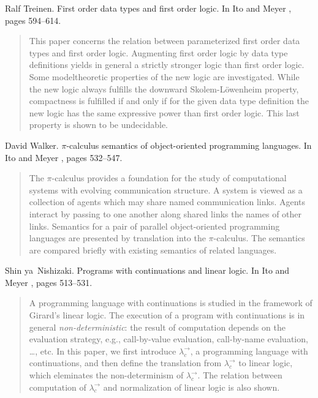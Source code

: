 \begin{thebibliography}{10}
Ralf Treinen.
\newblock First order data types and first order logic.
\newblock In Ito and Meyer \cite{TACS91}, pages 594--614.
\begin{quotation}
This paper concerns the relation between parameterized first order data types
  and first order logic. Augmenting first order logic by data type definitions
  yields in general a strictly stronger logic than first order logic. Some
  modeltheoretic properties of the new logic are investigated. While the new
  logic always fulfills the downward Skolem-L\"owenheim property, compactness
  is fulfilled if and only if for the given data type definition the new logic
  has the same expressive power than first order logic. This last property is
  shown to be undecidable.
\end{quotation}

David Walker.
\newblock $\pi$-calculus semantics of object-oriented programming languages.
\newblock In Ito and Meyer \cite{TACS91}, pages 532--547.
\begin{quotation}
The $\pi$-calculus provides a foundation for the study of computational systems
  with evolving communication structure. A system is viewed as a collection of
  agents which may share named communication links. Agents interact by passing
  to one another along shared links the names of other links. Semantics for a
  pair of parallel object-oriented programming languages are presented by
  translation into the $\pi$-calculus. The semantics are compared briefly with
  existing semantics of related languages.
\end{quotation}

Shin ya~Nishizaki.
\newblock Programs with continuations and linear logic.
\newblock In Ito and Meyer \cite{TACS91}, pages 513--531.
\begin{quotation}
A programming language with continuations is studied in the framework of
  Girard's linear logic. The execution of a program with continuations is in
  general {\em non-deterministic\/}: the result of computation depends on the
  evaluation strategy, e.g., call-by-value evaluation, call-by-name evaluation,
  \dots, etc. In this paper, we first introduce $\lambda^\rightarrow_c$, a
  programming language with continuations, and then define the translation from
  $\lambda^\rightarrow_c$ to linear logic, which eleminates the non-determinism
  of $\lambda^\rightarrow_c$. The relation between computation of
  $\lambda^\rightarrow_c$ and normalization of linear logic is also shown.
\end{quotation}

\end{thebibliography}


